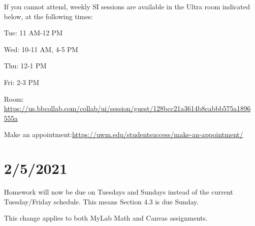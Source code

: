 \documentclass[]{article}
\begin{document}
If you cannot attend, weekly SI sessions are available in the Ultra room indicated below, at the following times: 

Tue: 11 AM-12 PM

Wed: 10-11 AM, 4-5 PM

Thu: 12-1 PM

Fri: 2-3 PM

Room: \url{https://us.bbcollab.com/collab/ui/session/guest/128bcc21a3614b8cabbb575a1896555a}

Make an appointment:\url{https://uwm.edu/studentsuccess/make-an-appointment/}



\section*{2/5/2021}
Homework will now be due on Tuesdays and Sundays instead of the current Tuesday/Friday schedule. This means Section 4.3 is due Sunday.

This change applies to both MyLab Math and Canvas assignments.
\end{document}

